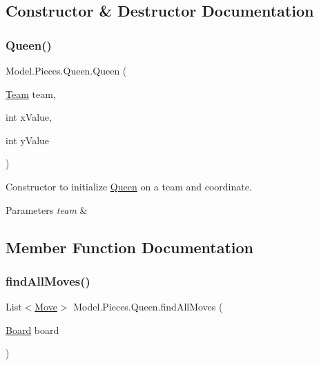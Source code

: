 \subsection{Constructor \& Destructor Documentation}
\hypertarget{class_model_1_1_pieces_1_1_queen_a975dd0d19b30fa943f53e3b8d23a5114}{}\label{class_model_1_1_pieces_1_1_queen_a975dd0d19b30fa943f53e3b8d23a5114} 
\subsubsection{\texorpdfstring{Queen()}{Queen()}}
{\footnotesize\ttfamily Model.\+Pieces.\+Queen.\+Queen (\begin{DoxyParamCaption}\item[{\hyperlink{class_model_1_1_team}{Team}}]{team,  }\item[{int}]{x\+Value,  }\item[{int}]{y\+Value }\end{DoxyParamCaption})}

Constructor to initialize \hyperlink{class_model_1_1_pieces_1_1_queen}{Queen} on a team and coordinate. 
\begin{DoxyParams}{Parameters}
{\em team} & \\
\hline
\end{DoxyParams}


\subsection{Member Function Documentation}
\hypertarget{class_model_1_1_pieces_1_1_queen_ae9cfa3e4e5ebd735f18aed1f66cce4c7}{}\label{class_model_1_1_pieces_1_1_queen_ae9cfa3e4e5ebd735f18aed1f66cce4c7} 
\subsubsection{\texorpdfstring{find\+All\+Moves()}{findAllMoves()}}
{\footnotesize\ttfamily List$<$\hyperlink{class_model_1_1_move}{Move}$>$ Model.\+Pieces.\+Queen.\+find\+All\+Moves (\begin{DoxyParamCaption}\item[{\hyperlink{class_model_1_1_board}{Board}}]{board }\end{DoxyParamCaption})}

